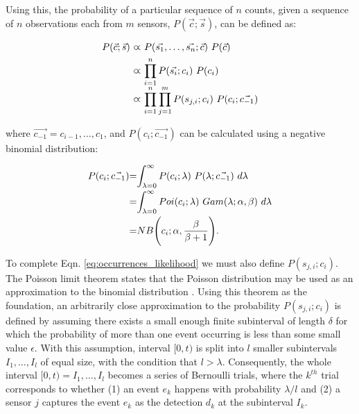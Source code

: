 Using this, the probability of a particular sequence of $n$ counts, given a sequence of $n$ observations each from $m$ sensors, $P(\vec{c} ; \vec{s})$, can be defined as:

\begin{equation}
    \label{eq:occurrences_likelihood}
    \begin{tabular}{r@{ $\varpropto$ }l}
        $P(\vec{c} ; \vec{s})$ & $P(\vec{s_1}, \ldots, \vec{s_n} ; \vec{c}) ~ P(\vec{c})$ \\ [1ex]
        & $\displaystyle\prod_{i=1}^{n} P(\vec{s_i} ; c_i) ~ P(c_i)$ \\ [2ex]
        & $\displaystyle\prod_{i=1}^{n} \displaystyle\prod_{j=1}^{m} P(s_{j,i} ; c_i) ~ P(c_i ; \vec{c_{-1}})$
    \end{tabular}
\end{equation}

\noindent where $\vec{c_{-1}} = c_{i-1}, \ldots, c_1$, and $P(c_i ; \vec{c_{-1}})$ can be calculated using a negative binomial distribution:

\begin{equation}
	\label{eq:unconditional_xi}
	\begin{tabular}{r@{=}l}
		$P(c_i ; \vec{c_{-1}})$ & $\displaystyle\int_{\lambda=0}^{\infty} P(c_i ; \lambda) ~ P(\lambda ; \vec{c_{-1}}) ~d\lambda$ \\ [2ex]
		& $\displaystyle\int_{\lambda=0}^{\infty} Poi(c_i ; \lambda) ~ Gam(\lambda ; \alpha, \beta) ~d\lambda$ \\ [2ex]
		& $NB\Bigg(c_i ; \alpha, \displaystyle\frac{\beta}{\beta + 1}\Bigg)$.
	\end{tabular}
\end{equation}

To complete Eqn. \ref{eq:occurrences_likelihood} we must also define $P(s_{j,i} ; c_i)$. The Poisson limit theorem states that the Poisson distribution may be used as an approximation to the binomial distribution \cite{papoulis2002probability}. Using this theorem as the foundation, an arbitrarily close approximation to the probability $P(s_{j,i} ; c_i)$ is defined by assuming there exists a small enough finite subinterval of length $\delta$ for which the probability of more than one event occurring is less than some small value $ \epsilon$. With this assumption, interval $[0, t)$ is split into $l$ smaller subintervals $I_1, \ldots, I_l$ of equal size, with the condition that $l > \lambda$. Consequently, the whole interval $[0, t) = I_1, \ldots, I_l$ becomes a series of Bernoulli trials, where the $k^{th}$ trial corresponds to whether (1) an event $e_k$ happens with probability $\lambda / l$ and (2) a sensor $j$ captures the event $e_k$ as the detection $d_k$ at the subinterval $I_k$.


